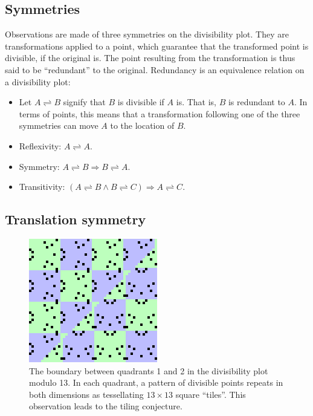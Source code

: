 \documentclass{article}
\begin{document}
\subsection{Symmetries}

Observations are made of three symmetries on the divisibility plot. They are transformations applied to a point, which guarantee that the transformed point is divisible, if the original is. The point resulting from the transformation is thus said to be ``redundant'' to the original. Redundancy is an equivalence relation on a divisibility plot:

\begin{itemize}
	\item Let \(A \rightleftharpoons B\) signify that \(B\) is divisible if \(A\) is. That is, \(B\) is redundant to \(A\). In terms of points, this means that a transformation following one of the three symmetries can move \(A\) to the location of \(B\).
	\item Reflexivity: \(A \rightleftharpoons A\).
	\item Symmetry: \(A \rightleftharpoons B \Rightarrow B \rightleftharpoons A\).
	\item Transitivity: \((A \rightleftharpoons B \land B \rightleftharpoons C) \Rightarrow A \rightleftharpoons C\).
\end{itemize}


\subsection{Translation symmetry}

\begin{figure}[h!]
	\centering
	\includegraphics{tiling}
	\caption{The boundary between quadrants 1 and 2 in the divisibility plot modulo 13. In each quadrant, a pattern of divisible points repeats in both dimensions as tessellating \(13 \times 13\) square ``tiles''. This observation leads to the tiling conjecture.}
	\label{tiling}
\end{figure}
\end{document}
